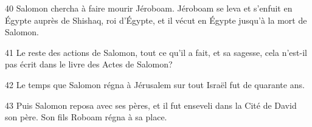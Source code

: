 
40 Salomon chercha à faire mourir Jéroboam. Jéroboam se leva et s’enfuit en Égypte auprès de Shishaq, roi d’Égypte, et il vécut en Égypte jusqu’à la mort de Salomon.

41 Le reste des actions de Salomon, tout ce qu’il a fait, et sa sagesse, cela n’est-il pas écrit dans le livre des Actes de Salomon?

42 Le temps que Salomon régna à Jérusalem sur tout Israël fut de quarante ans.

43 Puis Salomon reposa avec ses pères, et il fut enseveli dans la Cité de David son père. Son fils Roboam régna à sa place.